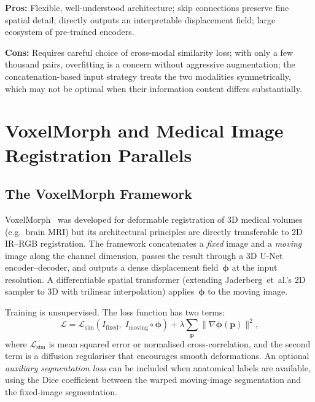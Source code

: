 \noindent\textbf{Pros:} Flexible, well-understood architecture; skip
connections preserve fine spatial detail; directly outputs an
interpretable displacement field; large ecosystem of pre-trained
encoders.

\noindent\textbf{Cons:} Requires careful choice of cross-modal
similarity loss; with only a few thousand pairs, overfitting is a
concern without aggressive augmentation; the concatenation-based input
strategy treats the two modalities symmetrically, which may not be
optimal when their information content differs substantially.


\section{VoxelMorph and Medical Image Registration Parallels}
\label{sec:voxelmorph}

\subsection{The VoxelMorph Framework}

VoxelMorph~\cite{balakrishnan2019voxelmorph} was developed for
deformable registration of 3D medical volumes (e.g.\ brain MRI) but
its architectural principles are directly transferable to 2D IR--RGB
registration.  The framework concatenates a \emph{fixed} image and a
\emph{moving} image along the channel dimension, passes the result
through a 3D U-Net encoder--decoder, and outputs a dense displacement
field~$\boldsymbol{\phi}$ at the input resolution.  A differentiable
spatial transformer (extending Jaderberg~et~al.'s 2D sampler to 3D with
trilinear interpolation) applies~$\boldsymbol{\phi}$ to the moving
image.

Training is unsupervised.  The loss function has two terms:
\[
    \mathcal{L} = \mathcal{L}_{\text{sim}}(I_{\text{fixed}},\;
        I_{\text{moving}} \circ \boldsymbol{\phi})
        + \lambda \sum_{\mathbf{p}} \|\nabla\boldsymbol{\phi}(\mathbf{p})\|^2,
\]
where $\mathcal{L}_{\text{sim}}$ is mean squared error or normalised
cross-correlation, and the second term is a diffusion regulariser that
encourages smooth deformations.  An optional \emph{auxiliary
segmentation loss} can be included when anatomical labels are available,
using the Dice coefficient between the warped moving-image segmentation
and the fixed-image segmentation.

